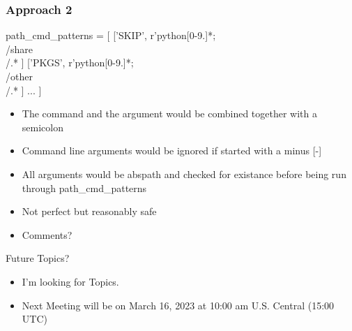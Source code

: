 \documentclass{beamer}
\begin{document}
\begin{frame}[fragile]
    \frametitle{Approach 2}
 {\tiny
    \begin{semiverbatim}
        path_cmd_patterns = [
        ['SKIP', r'python[0-9.]*;\\
        /share\\/.* ]
           ['PKGS', r'python[0-9.]*;\\/other\\/.* ]
           ...
           ]
    \end{semiverbatim}
}
  \begin{itemize}
    \item The command and the argument would be combined together with
      a semicolon
    \item Command line arguments would be ignored if started with a
      minus [-]
    \item All arguments would be abspath and checked for existance
      before being run through path\_cmd\_patterns
    \item Not perfect but reasonably safe
    \item Comments?
  \end{itemize}

\end{frame}

\begin{frame}{Future Topics?}
  \begin{itemize}
    \item I'm looking for Topics.
    \item Next Meeting will be on March 16, 2023 at 10:00 am
      U.S. Central (15:00 UTC)
  \end{itemize}
\end{frame}

%
\end{document}

